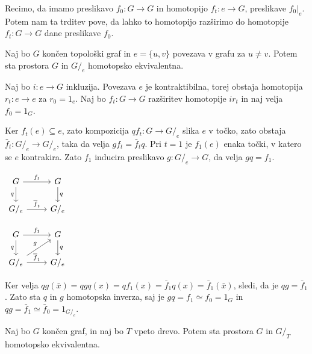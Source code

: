 \documentclass[mat1]{fmfdelo}
\begin{document}
Recimo, da imamo preslikavo $f_0\colon G\rightarrow G$ in homotopijo $f_t\colon e\rightarrow G$, preslikave $f_0|_e$. Potem nam ta trditev pove, da lahko to homotopijo razširimo do homotopije $f_t\colon G\rightarrow G$ dane preslikave $f_0$.

\begin{trditev}
    Naj bo $G$ končen topološki graf in  $e=\{u,v\}$ povezava v grafu za $u\neq v$. Potem sta prostora $G$ in $G/_e$ homotopsko ekvivalentna.
\end{trditev}

\begin{dokaz}
    Naj bo $i\colon e\rightarrow G$ inkluzija. Povezava $e$ je kontraktibilna, torej obstaja homotopija $r_t\colon e \rightarrow e$ za $r_0=1_e$. Naj bo $f_t\colon G\rightarrow G$ razširitev homotopije $ir_t$ in naj velja $f_0=1_G$.

    Ker $f_t(e)\subseteq e$, zato kompozicija $qf_t\colon G\rightarrow G/_e$ slika $e$ v točko, zato obstaja $\bar{f}_t\colon G/_e\rightarrow G/_e$, taka da velja $gf_t=\bar{f}_tq$. Pri $t=1$ je $f_1(e)$ enaka točki, v katero se $e$ kontrakira. Zato $f_1$ inducira preslikavo $g\colon G/_e \rightarrow G$, da velja $gq=f_1$.
    \begin{minipage}{0.4\textwidth}
        \centering
        $\begin{tikzcd}
            {G}\arrow{r}{f_t} \arrow[swap]{d}{q} & {G} \arrow{d}{q} \\
            G/_e \arrow{r}{\overline{f}_t} & G/_e
        \end{tikzcd}
        $
    \end{minipage}
    \begin{minipage}{0.4\textwidth}
        \centering
        $\begin{tikzcd}
            {G}\arrow{r}{f_1} \arrow[swap]{d}{q} & {G} \arrow{d}{q} \\
            G/_e \arrow{ru}{g} \arrow{r}{\overline{f}_1} & G/_e
        \end{tikzcd}
        $
    \end{minipage}
    
    Ker velja $qg(\bar{x})=qgq(x)=qf_1(x)=\bar{f}_1 q(x)=\bar{f}_1(\bar{x})$, sledi, da je $qg=\bar{f}_1$. Zato sta $q$ in $g$ homotopska inverza, saj je $gq=f_1\simeq f_0=1_G$ in $qg=\bar{f}_1\simeq \bar{f}_0 = 1_{G/_e}$.
\end{dokaz}

\begin{posledica}
    Naj bo $G$ končen graf, in naj bo $T$ vpeto drevo. Potem sta 
    prostora $G$ in $G/_T$ homotopsko ekvivalentna.
\end{posledica}
\end{document}
